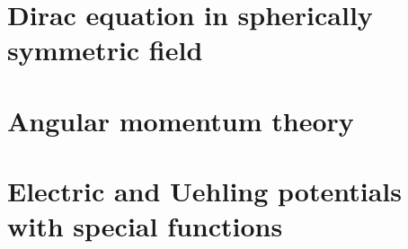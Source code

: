 \documentclass  [
  paper           = a4,
  BCOR            = 13mm, %
  twoside,
  fontsize        = 11pt, %
  DIV             = 12,   %
  chapterprefix,
  numbers         = noendperiod,
  headinclude     = true,
  footinclude     = false,
  headings        = big,
  headings        = openright,
  headsepline     = true,
  footsepline     = false,
  cleardoublepage = empty,
  titlepage       = true
]                                       {scrbook}
\begin{document}


  
  

  \frontmatter

  \tableofcontents
    \thispagestyle{plain}

  \mainmatter

  \cleardoublepage
  

  
  
  
  
   
  

  \cleardoublepage
  



  \cleardoublepage
  \appendix


  \chapter{Dirac equation in spherically symmetric field \label{app:dir_sph}}
    
    
  \chapter{Angular momentum theory \label{app:ang_theo}}
    
  
  \chapter{Electric and Uehling potentials with special functions \label{app:pots}}    
    
\end{document}
